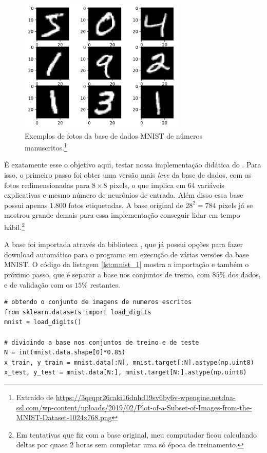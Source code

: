 \begin{figure}[htb]
\centering
\includegraphics[width=8cm]{figuras/mnist}
\caption{Exemplos de fotos da base de dados MNIST de números manuscritos.\footnote{Extraído de \url{https://3qeqpr26caki16dnhd19sv6by6v-wpengine.netdna-ssl.com/wp-content/uploads/2019/02/Plot-of-a-Subset-of-Images-from-the-MNIST-Dataset-1024x768.png}}}
\label{fig:mnist_fig}
\end{figure}

É exatamente esse o objetivo aqui, testar nossa implementação didática do . Para isso, o primeiro passo foi obter uma versão mais \emph{leve} da base de dados, com as fotos redimensionadas para $8 \times 8$ pixels, o que implica em $64$ variáveis explicativas e mesmo número de neurônios de entrada. Além disso essa base possui apenas $1.800$ fotos etiquetadas. A base original de $28^2 = 784$ pixels já se mostrou grande demais para essa implementação conseguir lidar em tempo hábil.\footnote{Em tentativas que fiz com a base original, meu computador ficou calculando deltas por quase 2 horas sem completar uma só época de treinamento.}

A base foi importada através da biblioteca , que já possui opções para fazer download automático para o programa em execução de várias versões da base MNIST. O código da listagem \ref{lst:mnist_1} mostra a importação e também o próximo passo, que é separar a base nos conjuntos de treino, com $85\%$ dos dados, e de validação com os $15\%$ restantes.

\begin{scriptsize}
\estiloR
\begin{lstlisting}[caption={Trecho do script \eng{mnist\_test.py}}, label={lst:mnist_1}, escapeinside={\%}]
# obtendo o conjunto de imagens de numeros escritos
from sklearn.datasets import load_digits
mnist = load_digits()

# dividindo a base nos conjuntos de treino e de teste
N = int(mnist.data.shape[0]*0.85)
x_train, y_train = mnist.data[:N], mnist.target[:N].astype(np.uint8)
x_test, y_test = mnist.data[N:], mnist.target[N:].astype(np.uint8)
\end{lstlisting}
\end{scriptsize}

